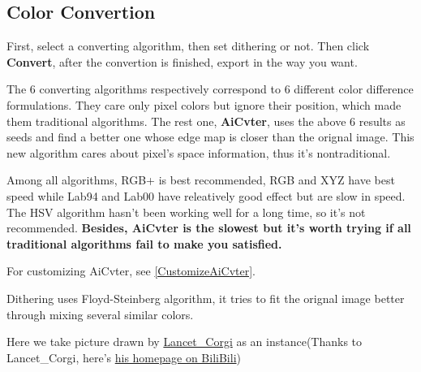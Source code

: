 \documentclass{article}
\begin{document}
\subsection{Color Convertion}

First, select a converting algorithm, then set dithering or not. Then click \textbf{Convert}, after the convertion is finished, export in the way you want.

The 6 converting algorithms respectively correspond to 6 different color difference formulations. They care only pixel colors but ignore their position, which made them traditional algorithms. The rest one, \textbf{AiCvter}, uses the above 6 results as seeds and find a better one whose edge map is closer than the orignal image. This new algorithm cares about pixel's space information, thus it's nontraditional.

Among all algorithms, RGB+ is best recommended, RGB and XYZ have best speed while Lab94 and Lab00 have releatively good effect but are slow in speed. The HSV algorithm hasn't been working well for a long time, so it's not recommended. \textbf{Besides, AiCvter is the slowest but it's worth trying if all traditional algorithms fail to make you satisfied.}

For customizing AiCvter, see \ref{CustomizeAiCvter}.

Dithering uses Floyd-Steinberg algorithm, it tries to fit the orignal image better through mixing several similar colors.

Here we take picture drawn by \href{https://t.bilibili.com/544583492149793294}{Lancet\_Corgi} as an instance(Thanks to Lancet\_Corgi, here's \href{https://space.bilibili.com/37171000}{his homepage on BiliBili})
\end{document}
